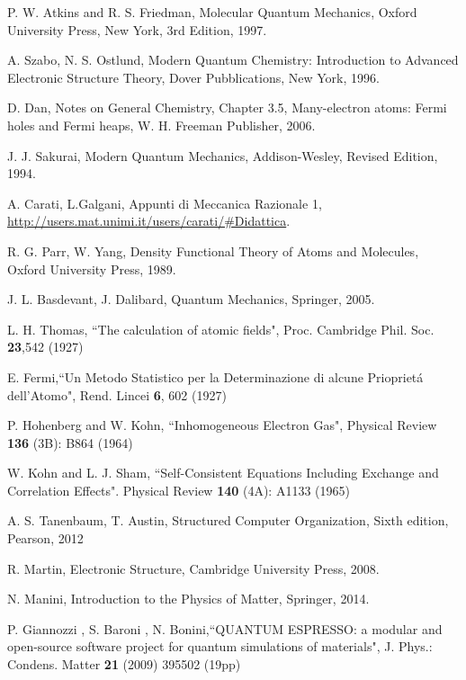 \documentclass[a4paper,12pt]{article}
\begin{document}
\clearpage
{}
\begin{thebibliography}{9}


P. W. Atkins and R. S. Friedman,
Molecular Quantum Mechanics,
Oxford University Press, New York,
3rd Edition,
1997.

A. Szabo, N. S. Ostlund,
Modern Quantum Chemistry: Introduction to Advanced Electronic Structure Theory,
Dover Pubblications, New York,
1996.

D. Dan, Notes on General Chemistry,
Chapter 3.5, Many-electron atoms: Fermi holes and Fermi heaps,
W. H. Freeman Publisher,
2006.

J. J. Sakurai,
Modern Quantum Mechanics,
Addison-Wesley,
Revised Edition,
1994.

A. Carati, L.Galgani,
Appunti di Meccanica Razionale 1,
\url{http://users.mat.unimi.it/users/carati/#Didattica}.

R. G. Parr, W. Yang,
Density Functional Theory of Atoms and Molecules,
Oxford University Press,
1989.

J. L. Basdevant, J. Dalibard,
Quantum Mechanics,
Springer,
2005.


L. H. Thomas, ``The calculation of atomic fields", Proc. Cambridge Phil. Soc. \textbf{23},542 (1927)

E. Fermi,``Un Metodo Statistico per la Determinazione di alcune Priopriet\'a dell'Atomo", Rend. Lincei \textbf{6}, 602 (1927)

P. Hohenberg and W. Kohn, ``Inhomogeneous Electron Gas",  Physical Review \textbf{136} (3B): B864 (1964)

W. Kohn and L. J. Sham, ``Self-Consistent Equations Including Exchange and Correlation Effects". Physical Review \textbf{140} (4A): A1133 (1965)


A. S. Tanenbaum, T. Austin,
Structured Computer Organization,
Sixth edition,
Pearson,
2012


R. Martin, 
Electronic Structure,
Cambridge University Press,
2008.

N. Manini, 
Introduction to the Physics of Matter,
Springer,
2014.


P. Giannozzi , S. Baroni , N. Bonini,``QUANTUM ESPRESSO: a modular and open-source software project for quantum simulations of materials", J. Phys.: Condens. Matter \textbf{21} (2009) 395502 (19pp)


\end{thebibliography}
\end{document}
